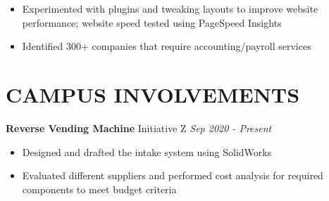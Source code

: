 \documentclass[11pt,A4,english]{article}
\begin{document}
\begin{paracol}{2}
\begin{rightcolumn}
\begin{addmargin}[0em]{0em}
\begin{addmargin}[-.5em]{0em}
\begin{itemize}
                \vspace{-.1cm}
                \item Experimented with plugins and tweaking layouts to improve website performance; website speed tested using PageSpeed Insights
                
                \vspace{-.1cm}
                \item Identified 300+ companies that require accounting/payroll services\\
                
                \vspace{-.1cm}
                \end{itemize}
            \end{addmargin}
        \end{addmargin}
    \vspace{0.25em}
    \section{CAMPUS INVOLVEMENTS}


        \begin{addmargin}[0em]{0em}
            {\bfseries Reverse Vending Machine} {\bfseries\textbar} Initiative Z \hfill \textit{Sep 2020 - Present}\\
            \vspace{-.3cm}
            \begin{addmargin}[-.5em]{0em}
                \begin{itemize}
                    \justifying
                    \item Designed and drafted the intake system using SolidWorks
                    \vspace{-.1cm}
                    \item Evaluated different suppliers and performed cost analysis for required components to meet budget criteria
                    \vspace{-.1cm}
                \end{itemize}
            \end{addmargin}
        \end{addmargin}
        

\end{rightcolumn}
\end{paracol}
\end{document}

